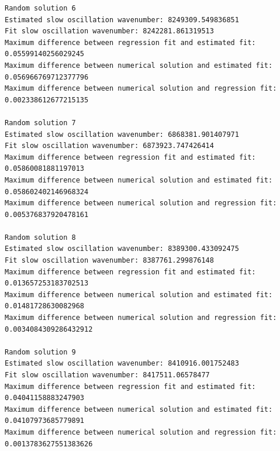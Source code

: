 \documentclass[11pt]{article}
\begin{document}
\begin{Verbatim}[commandchars=\\\{\}]
Random solution 6
Estimated slow oscillation wavenumber: 8249309.549836851
Fit slow oscillation wavenumber: 8242281.861319513
Maximum difference between regression fit and estimated fit: 0.05599140256029245
Maximum difference between numerical solution and estimated fit:
0.056966769712377796
Maximum difference between numerical solution and regression fit:
0.002338612677215135

Random solution 7
Estimated slow oscillation wavenumber: 6868381.901407971
Fit slow oscillation wavenumber: 6873923.747426414
Maximum difference between regression fit and estimated fit: 0.05860081881197013
Maximum difference between numerical solution and estimated fit:
0.058602402146968324
Maximum difference between numerical solution and regression fit:
0.005376837920478161

Random solution 8
Estimated slow oscillation wavenumber: 8389300.433092475
Fit slow oscillation wavenumber: 8387761.299876148
Maximum difference between regression fit and estimated fit:
0.013657253183702513
Maximum difference between numerical solution and estimated fit:
0.01481728630082968
Maximum difference between numerical solution and regression fit:
0.0034084309286432912

Random solution 9
Estimated slow oscillation wavenumber: 8410916.001752483
Fit slow oscillation wavenumber: 8417511.06578477
Maximum difference between regression fit and estimated fit: 0.04041158883247903
Maximum difference between numerical solution and estimated fit:
0.04107973685779891
Maximum difference between numerical solution and regression fit:
0.0013783627551383626

    \end{Verbatim}


    
    
    
\end{document}
